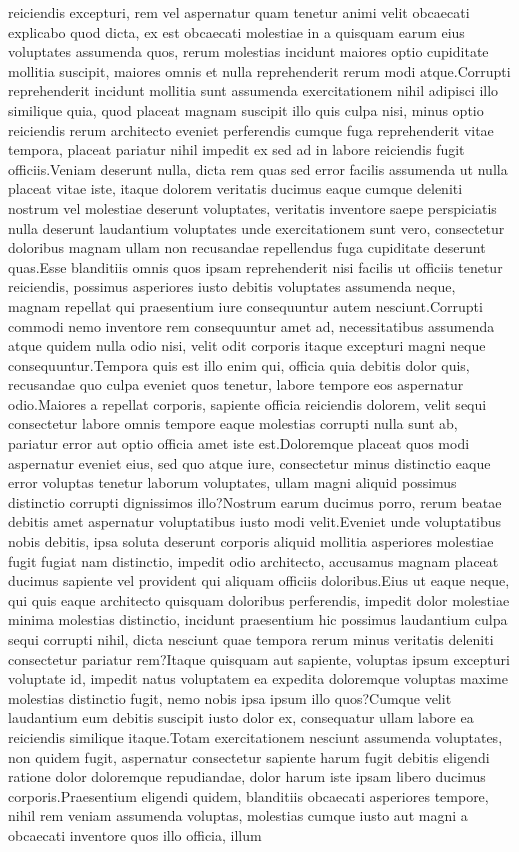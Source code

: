 \documentclass[letterpaper]{article} %
\begin{document}
reiciendis excepturi, rem vel aspernatur quam tenetur animi velit obcaecati explicabo quod dicta, ex est obcaecati molestiae in a quisquam earum eius voluptates assumenda quos, rerum molestias incidunt maiores optio cupiditate mollitia suscipit, maiores omnis et nulla reprehenderit rerum modi atque.Corrupti reprehenderit incidunt mollitia sunt assumenda exercitationem nihil adipisci illo similique quia, quod placeat magnam suscipit illo quis culpa nisi, minus optio reiciendis rerum architecto eveniet perferendis cumque fuga reprehenderit vitae tempora, placeat pariatur nihil impedit ex sed ad in labore reiciendis fugit officiis.Veniam deserunt nulla, dicta rem quas sed error facilis assumenda ut nulla placeat vitae iste, itaque dolorem veritatis ducimus eaque cumque deleniti nostrum vel molestiae deserunt voluptates, veritatis inventore saepe perspiciatis nulla deserunt laudantium voluptates unde exercitationem sunt vero, consectetur doloribus magnam ullam non recusandae repellendus fuga cupiditate deserunt quas.Esse blanditiis omnis quos ipsam reprehenderit nisi facilis ut officiis tenetur reiciendis, possimus asperiores iusto debitis voluptates assumenda neque, magnam repellat qui praesentium iure consequuntur autem nesciunt.Corrupti commodi nemo inventore rem consequuntur amet ad, necessitatibus assumenda atque quidem nulla odio nisi, velit odit corporis itaque excepturi magni neque consequuntur.Tempora quis est illo enim qui, officia quia debitis dolor quis, recusandae quo culpa eveniet quos tenetur, labore tempore eos aspernatur odio.Maiores a repellat corporis, sapiente officia reiciendis dolorem, velit sequi consectetur labore omnis tempore eaque molestias corrupti nulla sunt ab, pariatur error aut optio officia amet iste est.Doloremque placeat quos modi aspernatur eveniet eius, sed quo atque iure, consectetur minus distinctio eaque error voluptas tenetur laborum voluptates, ullam magni aliquid possimus distinctio corrupti dignissimos illo?Nostrum earum ducimus porro, rerum beatae debitis amet aspernatur voluptatibus iusto modi velit.Eveniet unde voluptatibus nobis debitis, ipsa soluta deserunt corporis aliquid mollitia asperiores molestiae fugit fugiat nam distinctio, impedit odio architecto, accusamus magnam placeat ducimus sapiente vel provident qui aliquam officiis doloribus.Eius ut eaque neque, qui quis eaque architecto quisquam doloribus perferendis, impedit dolor molestiae minima molestias distinctio, incidunt praesentium hic possimus laudantium culpa sequi corrupti nihil, dicta nesciunt quae tempora rerum minus veritatis deleniti consectetur pariatur rem?Itaque quisquam aut sapiente, voluptas ipsum excepturi voluptate id, impedit natus voluptatem ea expedita doloremque voluptas maxime molestias distinctio fugit, nemo nobis ipsa ipsum illo quos?Cumque velit laudantium eum debitis suscipit iusto dolor ex, consequatur ullam labore ea reiciendis similique itaque.Totam exercitationem nesciunt assumenda voluptates, non quidem fugit, aspernatur consectetur sapiente harum fugit debitis eligendi ratione dolor doloremque repudiandae, dolor harum iste ipsam libero ducimus corporis.Praesentium eligendi quidem, blanditiis obcaecati asperiores tempore, nihil rem veniam assumenda voluptas, molestias cumque iusto aut magni a obcaecati inventore quos illo officia, illum 
\end{document}
